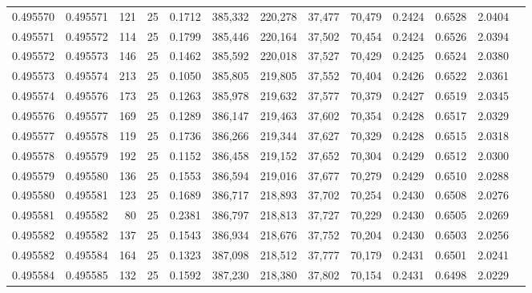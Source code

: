 \begin{tabular}{rrrrrrrrrrrrr}
0.495570 & 0.495571 &   121 &  25 &                                     0.1712 & 385,332 & 220,278 &  37,477 &  70,479 & 0.2424 & 0.6528 & 2.0404 \\
0.495571 & 0.495572 &   114 &  25 &                                     0.1799 & 385,446 & 220,164 &  37,502 &  70,454 & 0.2424 & 0.6526 & 2.0394 \\
0.495572 & 0.495573 &   146 &  25 &                                     0.1462 & 385,592 & 220,018 &  37,527 &  70,429 & 0.2425 & 0.6524 & 2.0380 \\
0.495573 & 0.495574 &   213 &  25 &                                     0.1050 & 385,805 & 219,805 &  37,552 &  70,404 & 0.2426 & 0.6522 & 2.0361 \\
0.495574 & 0.495576 &   173 &  25 &                                     0.1263 & 385,978 & 219,632 &  37,577 &  70,379 & 0.2427 & 0.6519 & 2.0345 \\
0.495576 & 0.495577 &   169 &  25 &                                     0.1289 & 386,147 & 219,463 &  37,602 &  70,354 & 0.2428 & 0.6517 & 2.0329 \\
0.495577 & 0.495578 &   119 &  25 &                                     0.1736 & 386,266 & 219,344 &  37,627 &  70,329 & 0.2428 & 0.6515 & 2.0318 \\
0.495578 & 0.495579 &   192 &  25 &                                     0.1152 & 386,458 & 219,152 &  37,652 &  70,304 & 0.2429 & 0.6512 & 2.0300 \\
0.495579 & 0.495580 &   136 &  25 &                                     0.1553 & 386,594 & 219,016 &  37,677 &  70,279 & 0.2429 & 0.6510 & 2.0288 \\
0.495580 & 0.495581 &   123 &  25 &                                     0.1689 & 386,717 & 218,893 &  37,702 &  70,254 & 0.2430 & 0.6508 & 2.0276 \\
0.495581 & 0.495582 &    80 &  25 &                                     0.2381 & 386,797 & 218,813 &  37,727 &  70,229 & 0.2430 & 0.6505 & 2.0269 \\
0.495582 & 0.495582 &   137 &  25 &                                     0.1543 & 386,934 & 218,676 &  37,752 &  70,204 & 0.2430 & 0.6503 & 2.0256 \\
0.495582 & 0.495584 &   164 &  25 &                                     0.1323 & 387,098 & 218,512 &  37,777 &  70,179 & 0.2431 & 0.6501 & 2.0241 \\
0.495584 & 0.495585 &   132 &  25 &                                     0.1592 & 387,230 & 218,380 &  37,802 &  70,154 & 0.2431 & 0.6498 & 2.0229 \\

\end{tabular}

